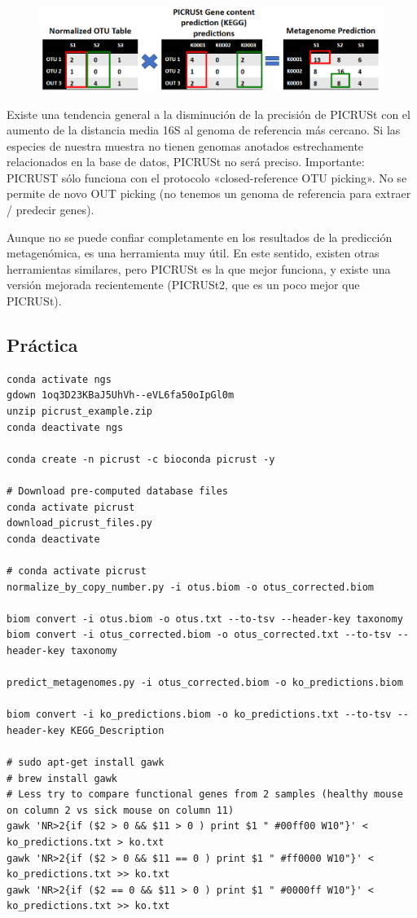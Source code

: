 \begin{figure}[h]
\centering
\includegraphics[width = \textwidth]{figs/picrust-prediccion.png}
\end{figure}

Existe una tendencia general a la disminución de la precisión de PICRUSt con el aumento de la distancia media 16S al genoma de referencia más cercano.
Si las especies de nuestra muestra no tienen genomas anotados estrechamente relacionados en la base de datos, PICRUSt no será preciso.
Importante: PICRUST sólo funciona con el protocolo «closed-reference OTU picking». No se permite de novo OUT picking (no tenemos un genoma de referencia para extraer / predecir genes).

Aunque no se puede confiar completamente en los resultados de la predicción metagenómica, es una herramienta muy útil. En este sentido, existen otras herramientas similares, pero PICRUSt es la que mejor funciona, y existe una versión mejorada recientemente (PICRUSt2, que es un poco mejor que PICRUSt).

\subsection{Práctica}
\begin{lstlisting}
conda activate ngs
gdown 1oq3D23KBaJ5UhVh--eVL6fa50oIpGl0m
unzip picrust_example.zip
conda deactivate ngs

conda create -n picrust -c bioconda picrust -y

# Download pre-computed database files
conda activate picrust
download_picrust_files.py
conda deactivate

# conda activate picrust
normalize_by_copy_number.py -i otus.biom -o otus_corrected.biom 

biom convert -i otus.biom -o otus.txt --to-tsv --header-key taxonomy
biom convert -i otus_corrected.biom -o otus_corrected.txt --to-tsv --header-key taxonomy

predict_metagenomes.py -i otus_corrected.biom -o ko_predictions.biom

biom convert -i ko_predictions.biom -o ko_predictions.txt --to-tsv --header-key KEGG_Description   

# sudo apt-get install gawk
# brew install gawk
# Less try to compare functional genes from 2 samples (healthy mouse on column 2 vs sick mouse on column 11)
gawk 'NR>2{if ($2 > 0 && $11 > 0 ) print $1 " #00ff00 W10"}' < ko_predictions.txt > ko.txt
gawk 'NR>2{if ($2 > 0 && $11 == 0 ) print $1 " #ff0000 W10"}' < ko_predictions.txt >> ko.txt
gawk 'NR>2{if ($2 == 0 && $11 > 0 ) print $1 " #0000ff W10"}' < ko_predictions.txt >> ko.txt
\end{lstlisting}

